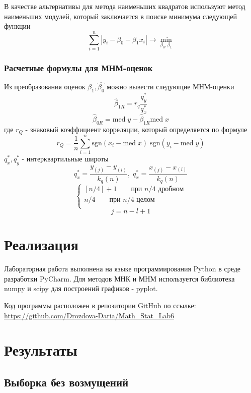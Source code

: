 \documentclass{article}
\begin{document}
В качестве альтернативы для метода наименьших квадратов используют метод наименьших модулей, который заключается в поиске минимума следующей функции
$$
\sum^n_{i=1} | y_i - \beta_0 - \beta_1x_i | \to \min_{\beta_0, \beta_1}
$$

\subsubsection{Расчетные формулы для МНМ-оценок}

Из преобразования оценок $\widehat{\beta_1}, \widehat{\beta_0}$ можно вывести следующие МНМ-оценки
\begin{equation}
\widehat{\beta}_{1R} = r_q \frac{q^*_y}{q_x^*}
\label{eq:4}
\end{equation}
\begin{equation}
\widehat{\beta}_{0R} = \mathrm{med} \; y - \widehat{\beta}_{1R} \mathrm{med} \; x
\label{eq:5}
\end{equation}
где $r_Q$ - знаковый коэффициент корреляции, который определяется по формуле
$$
r_Q = \frac{1}{n} \sum^n_{i=1} \mathrm{sgn}(x_i - \mathrm{med} \; x) \; \mathrm{sgn}(y_i - \mathrm{med} \; y)
$$
$q_x^*, q_y^*$ - интерквартильные широты
$$
q_x^* = \frac{y_{(j)} - y_{(l)}}{k_q(n)}, \; q_x^* = \frac{x_{(j)} - x_{(l)}}{k_q(n)}
$$
$$
\left \{ \begin{array} {rcl}
[n/4] + 1 \qquad \mbox{при $n/4$ дробном} \\
n/4 \qquad \mbox{при $n/4$ целом} \\
\end{array} \right .
$$
$$
j = n - l + 1
$$


\newpage
\section{Реализация}

Лабораторная работа выполнена на языке программирования Python в среде разработки PyCharm. Для методов МНК и МНМ используется библиотека numpy и scipy для построений графиков - pyplot.

Код программы расположен в репозитории GitHub по ссылке: \url{https://github.com/Drozdova-Daria/Math_Stat_Lab6}

\newpage
\section{Результаты}

\subsection{Выборка без возмущений}
\end{document}
